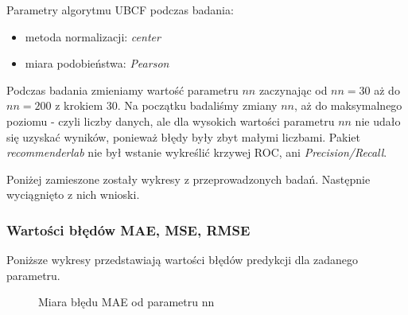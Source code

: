 \documentclass[12pt, a4paper]{article}
\begin{document}
Parametry algorytmu UBCF podczas badania:
\begin{itemize}
\item metoda normalizacji: \emph{center}
\item miara podobieństwa: \emph{Pearson}
\end{itemize}

Podczas badania zmieniamy wartość parametru $nn$ zaczynając od $nn=30$ aż do $nn=200$ z krokiem $30$. Na początku badaliśmy zmiany $nn$, aż do maksymalnego poziomu - czyli liczby danych, ale dla wysokich wartości parametru $nn$ nie udało się uzyskać wyników, ponieważ błędy były zbyt małymi liczbami. Pakiet \emph{recommenderlab} nie był wstanie wykreślić krzywej ROC, ani \emph{Precision/Recall}.

Poniżej zamieszone zostały wykresy z przeprowadzonych badań. Następnie wyciągnięto z nich wnioski.

\subsubsection{Wartości błędów MAE, MSE, RMSE}
Poniższe wykresy przedstawiają wartości błędów predykcji dla zadanego parametru.

\begin{figure}[H]
  \begin{center}
  \end{center}
  \caption{Miara błędu MAE od parametru nn}
  \label{fig:ubcf-nn-mae}
\end{figure}
\end{document}
